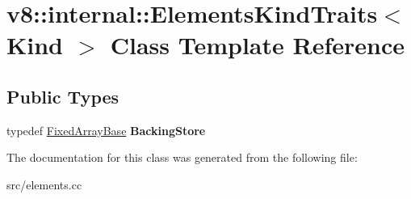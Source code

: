 \hypertarget{classv8_1_1internal_1_1_elements_kind_traits}{}\section{v8\+:\+:internal\+:\+:Elements\+Kind\+Traits$<$ Kind $>$ Class Template Reference}
\label{classv8_1_1internal_1_1_elements_kind_traits}
\subsection*{Public Types}
\begin{DoxyCompactItemize}
\item 
\hypertarget{classv8_1_1internal_1_1_elements_kind_traits_ae4014774fed9c85484fef6ab04d35c96}{}typedef \hyperlink{classv8_1_1internal_1_1_fixed_array_base}{Fixed\+Array\+Base} {\bfseries Backing\+Store}\label{classv8_1_1internal_1_1_elements_kind_traits_ae4014774fed9c85484fef6ab04d35c96}

\end{DoxyCompactItemize}


The documentation for this class was generated from the following file\+:\begin{DoxyCompactItemize}
\item 
src/elements.\+cc\end{DoxyCompactItemize}
